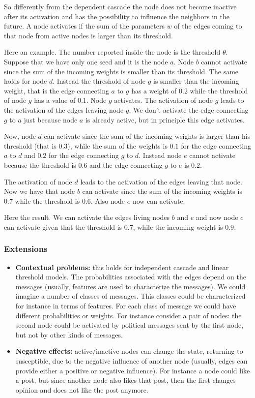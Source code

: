 \documentclass[10pt,a4paper]{article}
\begin{document}
So differently from the dependent cascade the node does not become inactive after its activation and has the possibility to influence the neighbors in the future. A node activates if the sum of the parameters $w$ of the edges coming to that node from active nodes is larger than its threshold.

Here an example. The number reported inside the node is the threshold $\theta$. Suppose that we have only one seed and it is the node $a$. Node $b$ cannot activate since the sum of the incoming weights is smaller than its threshold. The same holds for node $d$. Instead the threshold of node $g$ is smaller than the incoming weight, that is the edge connecting $a$ to $g$ has a weight of $0.2$ while the threshold of node $g$ has a value of $0.1$. Node $g$ activates. The activation of node $g$ leads to the activation of the edges leaving node $g$. We don't activate the edge connecting $g$ to $a$ just because node $a$ is already active, but in principle this edge activates.

Now, node $d$ can activate since the sum of the incoming weights is larger than his threshold (that is $0.3$), while the sum of the weights is $0.1$ for the edge connecting $a$ to $d$ and $0.2$ for the edge connecting $g$ to $d$. Instead node $e$ cannot activate because the threshold is $0.6$ and the edge connecting $g$ to $e$ is $0.2$.

The activation of node $d$ leads to the activation of the edges leaving that node. Now we have that node $b$ can activate since the sum of the incoming weights is $0.7$ while the threshold is $0.6$. Also node $e$ now can activate.

Here the result. We can activate the edges living nodes $b$ and $e$ and now node $c$ can activate given that the threshold is $0.7$, while the incoming weight is $0.9$.

\subsubsection{Extensions}\label{extensions}

\begin{itemize}
\item \textbf{Contextual problems:} this holds for independent cascade and linear threshold models. The probabilities associated with the edges depend on the messages (usually, features are used to characterize the messages). We could imagine a number of classes of messages. This classes could be characterized for instance in terms of features. For each class of message we could have different probabilities or weights. For instance consider a pair of nodes: the second node could be activated by political messages sent by the first node, but not by other kinds of messages.
\item \textbf{Negative effects:} active/inactive nodes can change the state, returning to susceptible, due to the negative influence of another node (usually, edges can provide either a positive or negative influence). For instance a node could like a post, but since another node also likes that post, then the first changes opinion and does not like the post anymore.
\end{itemize}
\end{document}
